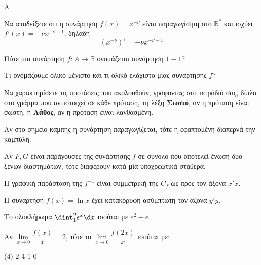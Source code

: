 \begin{thema}{A}
\begin{erwthma}
    \item Να αποδείξετε ότι η συνάρτηση $ f(x)=x^{-\nu} $
είναι παραγωγίσιμη στο $ \mathbb{R}^* $ και ισχύει $ f'(x)=-\nu x^{-\nu-1} $, δηλαδή
\[ \left(x^{-\nu} \right)'=-\nu x^{-\nu-1} \]
    \item Πότε μια συνάρτηση $f:A\to\mathbb{R}$ ονομάζεται συνάρτηση $1-1$?
    \item Τι ονομάζουμε ολικό μέγιστο και τι ολικό ελάχιστο μιας συνάρτησης $f$?
    \item Να χαρακτηρίσετε τις προτάσεις που ακολουθούν, γράφοντας στο τετράδιό σας, δίπλα στο γράμμα που αντιστοιχεί σε κάθε πρόταση, τη λέξη \textbf{Σωστό}, αν η πρόταση είναι σωστή, ή \textbf{Λάθος}, αν η πρόταση είναι λανθασμένη.
    \begin{alist}
        \item Αν στο σημείο καμπής η συνάρτηση παραγωγίζεται, τότε η εφαπτομένη διαπερνά την καμπύλη.
        \item Αν $F, G$ είναι παράγουσες της συνάρτησης $f$ σε σύνολο που αποτελεί ένωση δύο ξένων διαστημάτων, τότε διαφέρουν κατά μία υποχρεωτικά σταθερά.
        \item Η γραφική παράσταση της $f^{-1}$ είναι συμμετρική της $C_f$ ως προς τον άξονα $x'x$.
        \item H συνάρτηση $f(x)=\ln x$ έχει κατακόρυφη ασύμπτωτη τον άξονα $y'y$.
        \item Το ολοκλήρωμα $\dint_1^2 e^x \d x $ ισούται με $ e^2 - e$.
    \end{alist}
    \item Αν $\lim\limits_{x \to 0} \dfrac{f(x)}{x} = 2$, τότε το $\lim\limits_{x \to 0} \dfrac{f(2x)}{x}$ ισούται με:
    \begin{tasks}[label=\let\textdexiakeraia\relax\alph*.](4)
        \task $2$
        \task $4$
        \task $1$
        \task $0$
    \end{tasks}
\end{erwthma}
\end{thema}


